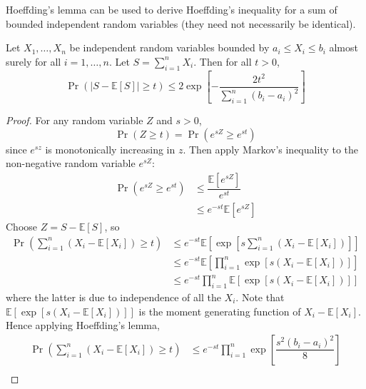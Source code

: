 \documentclass[11pt]{report} %
\begin{document}
Hoeffding's lemma can be used to derive Hoeffding's inequality for a sum of bounded independent random variables (they need not necessarily be identical).
\begin{theorem}
Let $X_{1}, \dots, X_{n}$ be independent random variables bounded by $a_{i} \leq X_{i} \leq b_{i}$ almost surely for all $i = 1, \dots, n$. Let $S = \sum_{i = 1}^{n}X_{i}$. Then for all $t > 0$, 
\begin{equation}
\operatorname{Pr}\left(\left|S - \mathbb{E}\left[S\right]\right| \geq t\right) \leq 2\exp\left[-\dfrac{2t^{2}}{\sum_{i = 1}^{n}\left(b_{i} - a_{i}\right)^{2}} \right]
\end{equation}
\end{theorem}
\begin{proof}
For any random variable $Z$ and $s > 0$,
\begin{equation}
\operatorname{Pr}\left(Z \geq t\right) = \operatorname{Pr}\left(e^{sZ} \geq e^{st}\right)
\end{equation}
since $e^{sz}$ is monotonically increasing in $z$. Then apply Markov's inequality to the non-negative random variable $e^{sZ}$:
\begin{align}
\operatorname{Pr}\left(e^{sZ} \geq e^{st}\right) &\leq \dfrac{\mathbb{E}\left[e^{sZ}\right]}{e^{st}} \\
&\leq e^{-st}\mathbb{E}\left[e^{sZ}\right]
\end{align}
Choose $Z = S - \mathbb{E}\left[S\right]$, so
\begin{align}
\operatorname{Pr}\left(\sum_{i = 1}^{n}\left(X_{i} - \mathbb{E}\left[X_{i}\right]\right) \geq t\right) &\leq e^{-st}\mathbb{E}\left[\exp\left[s\sum_{i = 1}^{n}\left(X_{i} - \mathbb{E}\left[X_{i}\right]\right)\right]\right]	 \\
&\leq e^{-st}\mathbb{E}\left[\prod_{i = 1}^{n}\exp\left[s\left(X_{i} - \mathbb{E}\left[X_{i}\right]\right)\right]\right] \\
&\leq e^{-st}\prod_{i = 1}^{n}\mathbb{E}\left[\exp\left[s\left(X_{i} - \mathbb{E}\left[X_{i}\right]\right)\right]\right]
\end{align}
where the latter is due to independence of all the $X_{i}$. Note that $\mathbb{E}\left[\exp\left[s\left(X_{i} - \mathbb{E}\left[X_{i}\right]\right)\right]\right]$ is the moment generating function of $X_{i} - \mathbb{E}\left[X_{i}\right]$. Hence applying Hoeffding's lemma,
\begin{align}
\operatorname{Pr}\left(\sum_{i = 1}^{n}\left(X_{i} - \mathbb{E}\left[X_{i}\right]\right) \geq t\right) &\leq e^{-st}\prod_{i = 1}^{n}\exp\left[\dfrac{s^{2}\left(b_{i} - a_{i}\right)^{2}}{8}\right] \\

\end{align}
\end{proof}
\end{document}
